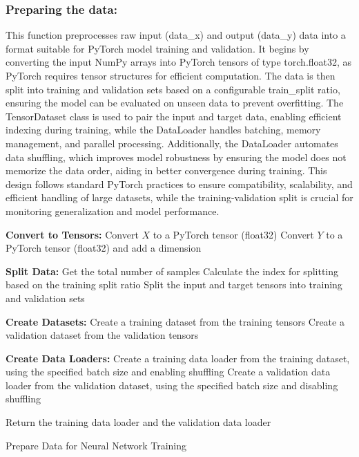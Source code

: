 \documentclass{article}
\begin{document}
\subsubsection{Preparing the data:}

This function preprocesses raw input (data\_x) and output (data\_y) data into a format suitable for PyTorch model training and validation. It begins by converting the input NumPy arrays into PyTorch tensors of type torch.float32, as PyTorch requires tensor structures for efficient computation. The data is then split into training and validation sets based on a configurable train\_split ratio, ensuring the model can be evaluated on unseen data to prevent overfitting. The TensorDataset class is used to pair the input and target data, enabling efficient indexing during training, while the DataLoader handles batching, memory management, and parallel processing. Additionally, the DataLoader automates data shuffling, which improves model robustness by ensuring the model does not memorize the data order, aiding in better convergence during training. This design follows standard PyTorch practices to ensure compatibility, scalability, and efficient handling of large datasets, while the training-validation split is crucial for monitoring generalization and model performance.\\


\begin{algorithm}[H]
\SetAlgoLined %

\textbf{Convert to Tensors:}\;
Convert \(X\) to a PyTorch tensor (float32)\;
Convert \(Y\) to a PyTorch tensor (float32) and add a dimension\;

\textbf{Split Data:}\;
Get the total number of samples\;
Calculate the index for splitting based on the training split ratio\;
Split the input and target tensors into training and validation sets\;

\textbf{Create Datasets:}\;
Create a training dataset from the training tensors\;
Create a validation dataset from the validation tensors\;

\textbf{Create Data Loaders:}\;
Create a training data loader from the training dataset, using the specified batch size and enabling shuffling\;
Create a validation data loader from the validation dataset, using the specified batch size and disabling shuffling\;

Return the training data loader and the validation data loader\;

\caption{Prepare Data for Neural Network Training}
\label{alg:prepare_data} %
\end{algorithm}\\
\end{document}
